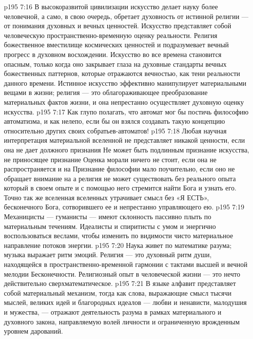 \vs p195 7:16 В высокоразвитой цивилизации искусство делает науку более человечной, а само, в свою очередь, обретает духовность от истинной религии --- от понимания духовных и вечных ценностей. Искусство представляет собой человеческую пространственно\hyp{}временную оценку реальности. Религия  божественное вместилище космических ценностей и подразумевает вечный прогресс в духовном восхождении. Искусство во все времена становится опасным, только когда оно закрывает глаза на духовные стандарты вечных божественных паттернов, которые отражаются вечностью, как тени реальности данного времени. Истинное искусство эффективно манипулирует материальными вещами в жизни; религия --- это облагораживающее преобразование материальных фактов жизни, и она непрестанно осуществляет духовную оценку искусства.
\vs p195 7:17 \pc Как глупо полагать, что автомат мог бы постичь философию автоматизма, и как нелепо, если бы он взялся создавать такую концепцию относительно других своих собратьев\hyp{}автоматов!
\vs p195 7:18 \pc Любая научная интерпретация материальной вселенной не представляет никакой ценности, если она не дает должного признания  Не может быть подлинным признание искусства, не приносящее признание  Оценка морали ничего не стоит, если она не распространяется и на  Признание философии мало поучительно, если оно не обращает внимание на  а религия не может существовать без реального опыта  который в своем опыте и с помощью него стремится найти Бога и узнать его. Точно так же вселенная вселенных утрачивает смысл без «Я ЕСТЬ», бесконечного Бога, сотворившего ее и непрестанно управляющего ею.
\vs p195 7:19 \pc Механицисты --- гуманисты --- имеют склонность пассивно плыть по материальным течениям. Идеалисты и спиритисты  с умом и энергично воспользоваться веслами, чтобы изменить по видимости чисто материальное направление потоков энергии.
\vs p195 7:20 \pc Наука живет по математике разума; музыка выражает ритм эмоций. Религия --- это духовный ритм души, находящейся в пространственно\hyp{}временной гармонии с тактами высшей и вечной мелодии Бесконечности. Религиозный опыт в человеческой жизни --- это нечто действительно сверхматематическое.
\vs p195 7:21 В языке алфавит представляет собой материальный механизм, тогда как слова, выражающие смысл тысячи мыслей, великих идей и благородных идеалов --- любви и ненависти, малодушия и мужества, --- отражают деятельность разума в рамках материального и духовного закона, направляемую волей личности и ограниченную врожденным уровнем дарований.
